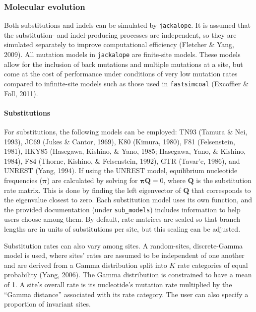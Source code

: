 \documentclass[12pt,]{article}
\let\oldparagraph\paragraph
\renewcommand{\paragraph}[1]{\oldparagraph{#1}\mbox{}}
\begin{document}
\hypertarget{molecular-evolution}{%
\subsubsection{Molecular evolution}\label{molecular-evolution}}

Both substitutions and indels can be simulated by \texttt{jackalope}.
It is assumed that the substitution- and indel-producing processes are independent,
so they are simulated separately to improve computational efficiency (Fletcher \& Yang, 2009).
All mutation models in \texttt{jackalope} are finite-site models.
These models allow for the inclusion of back mutations and multiple mutations at a site,
but come at the cost of performance under conditions of very low mutation rates
compared to infinite-site models such as those used in \texttt{fastsimcoal} (Excoffier \& Foll, 2011).

\hypertarget{substitutions}{%
\paragraph{Substitutions}\label{substitutions}}

For substitutions, the following models can be employed:
TN93 (Tamura \& Nei, 1993),
JC69 (Jukes \& Cantor, 1969),
K80 (Kimura, 1980),
F81 (Felsenstein, 1981),
HKY85 (Hasegawa, Kishino, \& Yano, 1985; Hasegawa, Yano, \& Kishino, 1984),
F84 (Thorne, Kishino, \& Felsenstein, 1992),
GTR (Tavar\a'e, 1986),
and UNREST (Yang, 1994).
If using the UNREST model, equilibrium nucleotide frequencies (\(\mathbf{\pi}\)) are
calculated by solving for \(\mathbf{\pi} \mathbf{Q} = 0\), where \(\mathbf{Q}\) is the
substitution rate matrix.
This is done by finding the left eigenvector of \(\mathbf{Q}\) that
corresponds to the eigenvalue closest to zero.
Each substitution model uses its own function, and the provided documentation
(under \texttt{sub\_models}) includes information to help users choose among them.
By default, rate matrices are scaled so that branch lengths are in units
of substitutions per site, but this scaling can be adjusted.

Substitution rates can also vary among sites.
A random-sites, discrete-Gamma model is used, where sites' rates are assumed to
be independent of one another and are derived from a Gamma distribution split into
\(K\) rate categories of equal probability (Yang, 2006).
The Gamma distribution is constrained to have a mean of 1.
A site's overall rate is its nucleotide's mutation rate multiplied by the
``Gamma distance'' associated with its rate category.
The user can also specify a proportion of invariant sites.
\end{document}

